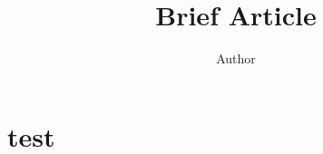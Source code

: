 \documentclass[11pt]{article} %
\title{Brief Article}
\author{Author}
\begin{document}
\maketitle
\tableofcontents

\section{test}

\newpage
\end{document}
